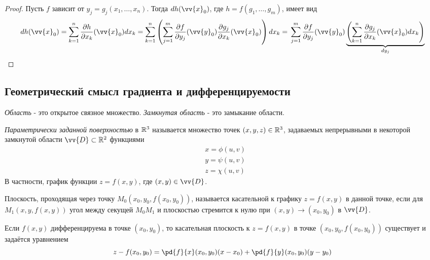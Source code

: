 \begin{proof}
	Пусть $f$ зависит от $y_j = g_j(x_1, \ldots, x_n)$. Тогда $dh(\vv{x}_0)$, где $h = f(g_1, \ldots, g_m)$, имеет вид
	\[
		dh(\vv{x}_0) = \suml_{k = 1}^n \frac{\vdelta h}{\vdelta x_k} (\vv{x}_0) dx_k = \suml_{k = 1}^n \left(\suml_{j = 1}^m \frac{\vdelta f}{\vdelta y_j} (\vv{y}_0) \frac{\vdelta g_j}{\vdelta x_k} (\vv{x}_0)\right) dx_k =
		\\
		\suml_{j = 1}^m \frac{\vdelta f}{\vdelta y_j} (\vv{y}_0) \underbrace{\left(\suml_{k = 1}^n \frac{\vdelta g_j}{\vdelta x_k} (\vv{x}_0) dx_k\right)}_{dy_j}
	\]
\end{proof}

\subsection{Геометрический смысл градиента и дифференцируемости}

\begin{definition}
	\textit{Область} - это открытое связное множество. \textit{Замкнутая область} - это замыкание области.
\end{definition}

\begin{definition}
	\textit{Параметрически заданной поверхностью} в $\mathbb{R}^3$ называется множество точек $(x, y, z) \in \mathbb{R}^3$, задаваемых непрерывными в некоторой замкнутой области $\vv{D} \subset \R^2$ функциями
	\begin{align*}
		&{x = \phi(u, v)}
		\\
		&{y = \psi(u, v)}
		\\
		&{z = \chi(u, v)}
	\end{align*}
	В частности, график функции $z = f(x, y)$, где $(x, y) \in \vv{D}$.
\end{definition}

\begin{definition}
	Плоскость, проходящая через точку $M_0(x_0, y_0, f(x_0, y_0))$, называется касательной к графику $z = f(x, y)$ в данной точке, если для $M_1(x, y, f(x, y))$ угол между секущей $M_0 M_1$ и плоскостью стремится к нулю при $(x, y) \to (x_0, y_0)$ в $\vv{D}$.
\end{definition}


\begin{theorem}
	Если $f(x, y)$ дифференцируема в точке $(x_0, y_0)$, то касательная плоскость к $z = f(x, y)$ в точке $(x_0, y_0, f(x_0, y_0))$ существует и задаётся уравнением
	\[
		z - f(x_0, y_0) = \pd{f}{x} (x_0, y_0) (x - x_0) + \pd{f}{y} (x_0, y_0) (y - y_0)
	\]
\end{theorem}

